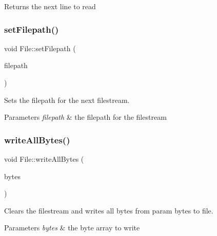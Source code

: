 \begin{DoxyReturn}{Returns}
the next line to read 
\end{DoxyReturn}
\mbox{\label{class_file_ae5b50c42cb117914a87347461b4bfb56}} 
\subsubsection{\texorpdfstring{setFilepath()}{setFilepath()}}
{\footnotesize\ttfamily void File\+::set\+Filepath (\begin{DoxyParamCaption}\item[{const \mbox{\hyperlink{class_a_string}{A\+String}} \&}]{filepath }\end{DoxyParamCaption})}



Sets the filepath for the next filestream. 


\begin{DoxyParams}{Parameters}
{\em filepath} & the filepath for the filestream \\
\hline
\end{DoxyParams}
\mbox{\label{class_file_a7fd6b7ead40f02ea7e578e281465bf80}} 
\subsubsection{\texorpdfstring{writeAllBytes()}{writeAllBytes()}}
{\footnotesize\ttfamily void File\+::write\+All\+Bytes (\begin{DoxyParamCaption}\item[{const \mbox{\hyperlink{class_byte_array}{Byte\+Array}} \&}]{bytes }\end{DoxyParamCaption})}



Clears the filestream and writes all bytes from param bytes to file. 


\begin{DoxyParams}{Parameters}
{\em bytes} & the byte array to write \\
\hline
\end{DoxyParams}
\mbox{\label{class_file_a3d0bdb094fd754890130f27493792d05}} 
